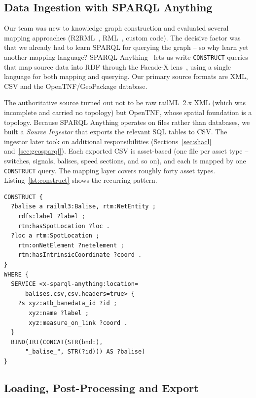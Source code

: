 \documentclass{ceurart}
\begin{document}
\subsection{Data Ingestion with SPARQL Anything}

Our team was new to knowledge graph construction and evaluated several mapping
approaches (R2RML~\cite{r2rml}, RML~\cite{rml}, custom code). The decisive factor
was that we already had to learn SPARQL for querying the graph -- so why learn
yet another mapping language? SPARQL Anything~\cite{sparqlanything} lets us write
\texttt{CONSTRUCT} queries that map source data into RDF through the Facade-X
lens~\cite{facadex}, using a single language for both mapping and querying. Our
primary source formats are XML, CSV and the OpenTNF/GeoPackage database.

The authoritative source turned out not to be raw railML~2.x XML (which was
incomplete and carried no topology) but OpenTNF, whose spatial foundation is a
topology. Because SPARQL Anything operates on files rather than databases, we
built a \emph{Source Ingestor} that exports the relevant SQL tables to CSV. The
ingestor later took on additional responsibilities (Sections~\ref{sec:shacl}
and~\ref{sec:geosparql}). Each exported CSV is asset-based (one file per asset
type -- switches, signals, balises, speed sections, and so on), and each is
mapped by one \texttt{CONSTRUCT} query. The mapping layer covers roughly forty
asset types. Listing~\ref{lst:construct} shows the recurring pattern.

\begin{lstlisting}[language=sparql,caption={Asset mapping with SPARQL Anything: a
  \texttt{SERVICE} clause reads a CSV through Facade-X; the \texttt{CONSTRUCT}
  builds railML/RTM triples and positions the asset by intrinsic
  coordinate.},label={lst:construct}]
CONSTRUCT {
  ?balise a railml3:Balise, rtm:NetEntity ;
    rdfs:label ?label ;
    rtm:hasSpotLocation ?loc .
  ?loc a rtm:SpotLocation ;
    rtm:onNetElement ?netelement ;
    rtm:hasIntrinsicCoordinate ?coord .
}
WHERE {
  SERVICE <x-sparql-anything:location=
      balises.csv,csv.headers=true> {
    ?s xyz:atb_banedata_id ?id ;
       xyz:name ?label ;
       xyz:measure_on_link ?coord .
  }
  BIND(IRI(CONCAT(STR(bnd:),
      "_balise_", STR(?id))) AS ?balise)
}
\end{lstlisting}

\subsection{Loading, Post-Processing and Export}
\end{document}
